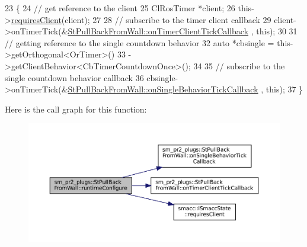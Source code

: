\begin{DoxyCode}
23     \{
24         \textcolor{comment}{// get reference to the client}
25         ClRosTimer *client;
26         this->\hyperlink{classsmacc_1_1ISmaccState_a7f95c9f0a6ea2d6f18d1aec0519de4ac}{requiresClient}(client);
27 
28         \textcolor{comment}{// subscribe to the timer client callback}
29         client->onTimerTick(&\hyperlink{structsm__pr2__plugs_1_1StPullBackFromWall_a7872156a77c675539830c016e703c499}{StPullBackFromWall::onTimerClientTickCallback}
      , \textcolor{keyword}{this});
30 
31         \textcolor{comment}{// getting reference to the single countdown behavior}
32         \textcolor{keyword}{auto} *cbsingle = this->getOrthogonal<OrTimer>()
33                              ->getClientBehavior<CbTimerCountdownOnce>();
34 
35         \textcolor{comment}{// subscribe to the single countdown behavior callback}
36         cbsingle->onTimerTick(&\hyperlink{structsm__pr2__plugs_1_1StPullBackFromWall_a42e04e36271bd14285b42df5c1988209}{StPullBackFromWall::onSingleBehaviorTickCallback}
      , \textcolor{keyword}{this});
37     \}
\end{DoxyCode}
Here is the call graph for this function\+:
\nopagebreak
\begin{figure}[H]
\begin{center}
\leavevmode
\includegraphics[width=350pt]{structsm__pr2__plugs_1_1StPullBackFromWall_a1be08c0cdc17a5c038cd8549118f98a6_cgraph}
\end{center}
\end{figure}
\mbox{\label{structsm__pr2__plugs_1_1StPullBackFromWall_ac2b8294a8c707ed4a4bb867fac511f7f}} 
